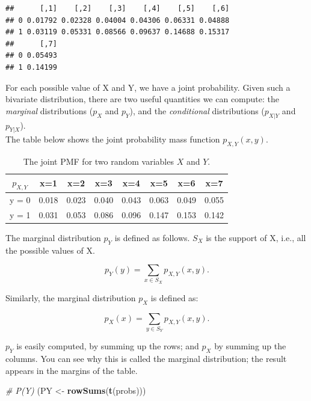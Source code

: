 \documentclass[12pt,]{krantz}
\newenvironment{Shaded}{\begin{snugshade}}{\end{snugshade}}
\newcommand{\CommentTok}[1]{\textcolor[rgb]{0.56,0.35,0.01}{\textit{#1}}}
\newcommand{\KeywordTok}[1]{\textcolor[rgb]{0.13,0.29,0.53}{\textbf{#1}}}
\newcommand{\NormalTok}[1]{#1}
\newcommand{\StringTok}[1]{\textcolor[rgb]{0.31,0.60,0.02}{#1}}
\begin{document}
\begin{verbatim}
##      [,1]    [,2]    [,3]    [,4]    [,5]    [,6]
## 0 0.01792 0.02328 0.04004 0.04306 0.06331 0.04888
## 1 0.03119 0.05331 0.08566 0.09637 0.14688 0.15317
##      [,7]
## 0 0.05493
## 1 0.14199
\end{verbatim}

For each possible value of X and Y, we have a joint probability. Given such a bivariate distribution, there are two useful quantities we can compute: the \emph{marginal} distributions (\(p_{X}\) and \(p_Y\)), and the \emph{conditional} distributions (\(p_{X|Y}\) and \(p_{Y|X}\)).\\
The table below shows the joint probability mass function \(p_{X,Y}(x,y)\).

\begin{table}[!htbp] 
\begin{center}
\begin{tabular}{c|ccccccc}
$p_{X,Y}$ & x=1 & x=2 & x=3 & x=4 & x=5 & x=6 & x=7\\
\hline
y = 0 & 0.018 & 0.023 & 0.040 & 0.043 & 0.063 & 0.049 & 0.055\\
y = 1 & 0.031 & 0.053 & 0.086 & 0.096 &  0.147 & 0.153 &  0.142\\
\end{tabular}
\end{center}
\caption{The joint PMF for two random variables $X$ and $Y$.}\label{discretebivartable}
\end{table}

The marginal distribution \(p_Y\) is defined as follows. \(S_{X}\) is the support of X, i.e., all the possible values of X.

\begin{equation}
p_{Y}(y)=\sum_{x\in S_{X}}p_{X,Y}(x,y).\label{eq-marginal-pmf}
\end{equation}

Similarly, the marginal distribution \(p_X\) is defined as:

\begin{equation}
p_{X}(x)=\sum_{y\in S_{Y}}p_{X,Y}(x,y).\label{eq-marginal-pmf2}
\end{equation}

\(p_Y\) is easily computed, by summing up the rows; and \(p_X\) by summing up the columns. You can see why this is called the marginal distribution; the result appears in the margins of the table.

\begin{Shaded}
\begin{Highlighting}[]
\CommentTok{# P(Y)}
\NormalTok{(PY <-}\StringTok{ }\KeywordTok{rowSums}\NormalTok{(}\KeywordTok{t}\NormalTok{(probs)))}
\end{Highlighting}
\end{Shaded}
\end{document}
